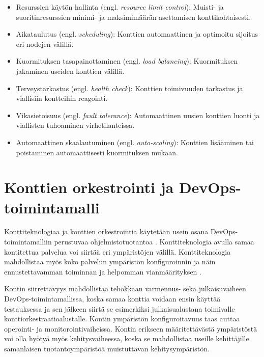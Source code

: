 \begin{itemize}
\item Resurssien käytön hallinta (engl. \textit{resource limit control}): Muisti- ja suoritinresurssien minimi- ja maksimimäärän asettamisen konttikohtaisesti.
\item Aikataulutus (engl. \textit{scheduling}): Konttien automaattinen ja optimoitu sijoitus eri nodejen välillä.
\item Kuormituksen tasapainottaminen (engl. \textit{load balancing}): Kuormituksen jakaminen useiden konttien välillä. 
\item Terveystarkastus (engl. \textit{health check}): Konttien toimivuuden tarkastus ja viallisiin kontteihin reagointi.
\item Vikasietoisuus (engl. \textit{fault tolerance}): Automaattinen uusien konttien luonti ja viallisten tuhoaminen virhetilanteissa.
\item Automaattinen skaalautuminen (engl. \textit{auto-scaling}): Konttien lisääminen tai poistaminen automaattisesti kuormituksen mukaan.
\end{itemize}



\section{Konttien orkestrointi ja DevOps-toimintamalli}

Konttiteknologiaa ja konttien orkestrointia käytetään usein osana DevOps-toimintamalliin perustuvaa ohjelmistotuotantoa \cite{Kang16, Narasimhulu23}.
Konttiteknologia avulla samaa kontitettua palvelua voi siirtää eri ympäristöjen välillä.
Konttiteknologia mahdollistaa myös koko palvelun ympäristön konfiguroinnin ja näin ennustettavamman toiminnan ja helpomman vianmäärityksen \cite{Narasimhulu23}.

Kontin siirrettävyys mahdollistaa tehokkaan varmennus- sekä julkaisuvaiheen DevOps-toimintamallissa, koska samaa konttia voidaan ensin käyttää testauksessa ja sen jälkeen siirtä se esimerkiksi julkaisualustana toimivalle konttiorkestraatioalustalle.
Kontin ympäristön konfiguroitavuus taas auttaa operointi- ja monitorointivaiheissa.
Kontin erikseen määritettävästä ympäristöstä voi olla hyötyä myös kehitysvaiheessa, koska se mahdollistaa useille kehittäjille samanlaisen tuotantoympäristöä muistuttavan kehitysympäristön.

